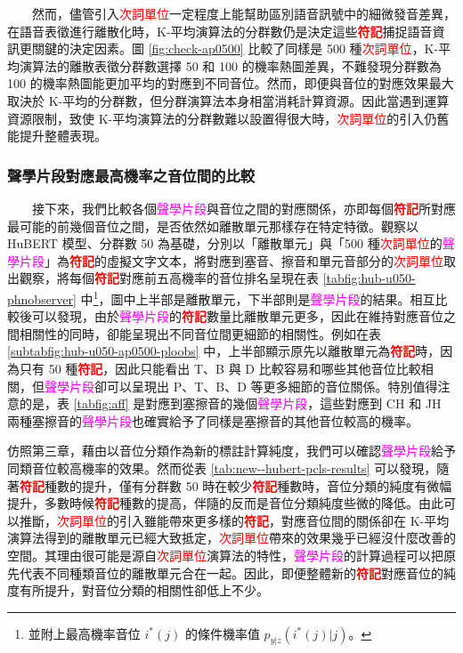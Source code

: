 　　然而，儘管引入\textcolor{red}{次詞單位}一定程度上能幫助區別語音訊號中的細微發音差異，在語音表徵進行離散化時，K-平均演算法的分群數仍是決定這些\textbf{\textcolor{red}{符記}}捕捉語音資訊更關鍵的決定因素。圖 \ref{fig:check-ap0500} 比較了同樣是 500 種\textcolor{red}{次詞單位}，K-平均演算法的離散表徵分群數選擇 50 和 100 的機率熱圖差異，不難發現分群數為 100 的機率熱圖能更加平均的對應到不同音位。然而，即便與音位的對應效果最大取決於 K-平均的分群數，但分群演算法本身相當消耗計算資源。因此當遇到運算資源限制，致使 K-平均演算法的分群數難以設置得很大時，\textcolor{red}{次詞單位}的引入仍舊能提升整體表現。

\subsubsection{聲學片段對應最高機率之音位間的比較}

　　接下來，我們比較各個\textcolor{magenta}{聲學片段}與音位之間的對應關係，亦即每個\textbf{\textcolor{red}{符記}}所對應最可能的前幾個音位之間，是否依然如離散單元那樣存在特定特徵。觀察以 HuBERT 模型、分群數 50 為基礎，分別以「離散單元」與「500 種\textcolor{red}{次詞單位}的\textcolor{magenta}{聲學片段}」為\textbf{\textcolor{red}{符記}}的虛擬文字文本，將對應到塞音、擦音和單元音部分的\textcolor{red}{次詞單位}取出觀察，將每個\textbf{\textcolor{red}{符記}}對應前五高機率的音位排名呈現在表 \ref{tabfig:hub-u050-phnobserver} 中\footnote{並附上最高機率音位 $i^*(j)$ 的條件機率值 $p_{y|z}(i^*(j)|j)$。}，圖中上半部是離散單元，下半部則是\textcolor{magenta}{聲學片段}的結果。相互比較後可以發現，由於\textcolor{magenta}{聲學片段}的\textbf{\textcolor{red}{符記}}數量比離散單元更多，因此在維持對應音位之間相關性的同時，卻能呈現出不同音位間更細節的相關性。例如在表 \ref{subtabfig:hub-u050-ap0500-ploobs} 中，上半部顯示原先以離散單元為\textbf{\textcolor{red}{符記}}時，因為只有 50 種\textbf{\textcolor{red}{符記}}，因此只能看出 T、B 與 D 比較容易和哪些其他音位比較相關，但\textcolor{magenta}{聲學片段}卻可以呈現出 P、T、B、D 等更多細節的音位關係。特別值得注意的是，表 \ref{tabfig:aff} 是對應到塞擦音的幾個\textcolor{magenta}{聲學片段}，這些對應到 CH 和 JH 兩種塞擦音的\textcolor{magenta}{聲學片段}也確實給予了同樣是塞擦音的其他音位較高的機率。

        仿照第三章，藉由以音位分類作為新的標註計算純度，我們可以確認\textcolor{magenta}{聲學片段}給予同類音位較高機率的效果。然而從表 \ref{tab:new--hubert-pcls-results} 可以發現，隨著\textbf{\textcolor{red}{符記}}種數的提升，僅有分群數 50 時在較少\textbf{\textcolor{red}{符記}}種數時，音位分類的純度有微幅提升，多數時候\textbf{\textcolor{red}{符記}}種數的提高，伴隨的反而是音位分類純度些微的降低。由此可以推斷，\textcolor{red}{次詞單位}的引入雖能帶來更多樣的\textbf{\textcolor{red}{符記}}，對應音位間的關係卻在 K-平均演算法得到的離散單元已經大致抵定，\textcolor{red}{次詞單位}帶來的效果幾乎已經沒什麼改善的空間。其理由很可能是源自\textcolor{red}{次詞單位}演算法的特性，\textcolor{magenta}{聲學片段}的計算過程可以把原先代表不同種類音位的離散單元合在一起。因此，即便整體新的\textbf{\textcolor{red}{符記}}對應音位的純度有所提升，對音位分類的相關性卻低上不少。

